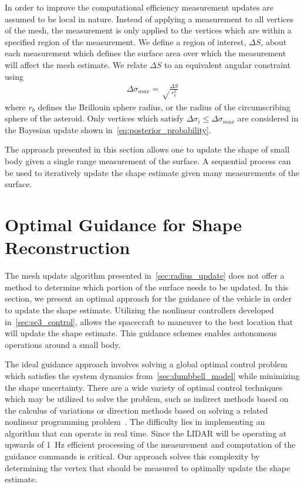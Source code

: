 \documentclass[letterpaper, paper,11pt]{AAS}		%
\begin{document}
In order to improve the computational efficiency measurement updates are assumed to be local in nature.
Instead of applying a measurement to all vertices of the mesh, the measurement is only applied to the vertices which are within a specified region of the measurement. 
We define a region of interest, \( \Delta S \), about each measurement which defines the surface area over which the measurement will affect the mesh estimate.
We relate \( \Delta S \) to an equivalent angular constraint using
\begin{align}\label{eq:region_of_interest}
    \Delta \sigma_{max} = \sqrt \frac{\Delta S}{r_b^2}
\end{align}
where \( r_b \) defines the Brillouin  sphere radius, or the radius of the circumscribing sphere of the asteroid.
Only vertices which satisfy \( \Delta \sigma_i \leq \Delta \sigma_{max} \) are considered in the Bayesian update shown in~\cref{eq:posterior_probability}.

The approach presented in this section allows one to update the shape of small body given a single range measurement of the surface.
A sequential process can be used to iteratively update the shape estimate given many measurements of the surface. 

\section{Optimal Guidance for Shape Reconstruction}\label{sec:explore_asteroid}

The mesh update algorithm presented in~\cref{sec:radius_update} does not offer a method to determine which portion of the surface needs to be updated. 
In this section, we present an optimal approach for the guidance of the vehicle in order to update the shape estimate.
Utilizing the nonlinear controllers developed in~\cref{sec:se3_control}, allows the spacecraft to maneuver to the best location that will update the shape estimate.
This guidance schemes enables autonomous operations around a small body.

The ideal guidance approach involves solving a global optimal control problem which satisfies the system dynamics from~\cref{sec:dumbbell_model} while minimizing the shape uncertainty.
There are a wide variety of optimal control techniques which may be utilized to solve the problem, such as indirect methods based on the calculus of variations or direction methods based on solving a related nonlinear programming problem~\cite{kirk2012,bryson1975}.
The difficulty lies in implementing an algorithm that can operate in real time.
Since the LIDAR will be operating at upwards of \SI{1}{\hertz} efficient processing of the measurement and computation of the guidance commands is critical.
Our approach solves this complexity by determining the vertex that should be measured to optimally update the shape estimate.
\end{document}
